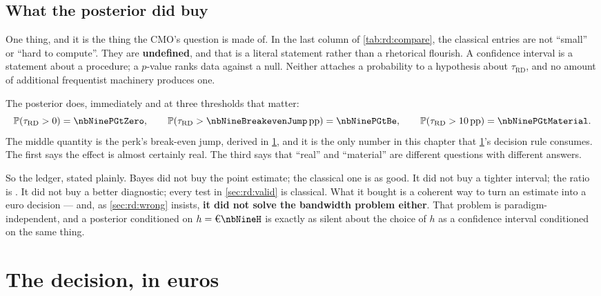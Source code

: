 \subsection*{What the posterior did buy}

One thing, and it is the thing the CMO's question is made of. In the last column of
\cref{tab:rd:compare}, the classical entries are not ``small'' or ``hard to compute''. They are
\textbf{undefined}, and that is a literal statement rather than a rhetorical flourish. A confidence
interval is a statement about a procedure; a $p$-value ranks data against a null. Neither attaches a
probability to a hypothesis about $\tau_{\mathrm{RD}}$, and no amount of additional frequentist
machinery produces one.

The posterior does, immediately and at three thresholds that matter:
%
\begin{equation}
  \Prob(\tau_{\mathrm{RD}} > 0) = \nbNinePGtZero, \qquad
  \Prob(\tau_{\mathrm{RD}} > \nbNineBreakevenJump\,\text{pp}) = \nbNinePGtBe, \qquad
  \Prob(\tau_{\mathrm{RD}} > 10\,\text{pp}) = \nbNinePGtMaterial .
  \label{eq:rd:probs}
\end{equation}
%
The middle quantity is the perk's break-even jump, derived in \cref{sec:rd:euro}, and it is the only
number in this chapter that \cref{sec:rd:euro}'s decision rule consumes. The first says the effect is
almost certainly real. The third says that ``real'' and ``material'' are different questions with
different answers.

So the ledger, stated plainly. Bayes did not buy the point estimate; the classical one is as good.
It did not buy a tighter interval; the ratio is \nbNineWidthRatio. It did not buy a better
diagnostic; every test in \cref{sec:rd:valid} is classical. What it bought is a coherent way to turn
an estimate into a euro decision --- and, as \cref{sec:rd:wrong} insists, \textbf{it did not solve
the bandwidth problem either}. That problem is paradigm-independent, and a posterior conditioned on
$h = \eur{\nbNineH}$ is exactly as silent about the choice of $h$ as a confidence interval
conditioned on the same thing.

\section{The decision, in euros}
\label{sec:rd:euro}

